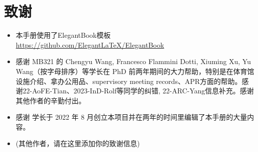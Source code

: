 \chapter{致谢}
\begin{itemize}
    \item 本手册使用了ElegantBook模板 \url{https://github.com/ElegantLaTeX/ElegantBook}
    \item \Wu \space 感谢 MB321 的 Chengyu Wang, Francesco Flammini Dotti, Xiuming Xu, Yu Wang（按字母排序）等学长在 PhD 前两年期间的大力帮助，特别是在体育馆设施介绍、拿办公用品、supervisory meeting records、APR方面的帮助。感谢22-AoFE-Tian、2023-InD-Rolf等同学的纠错, 22-ARC-Yang信息补充。感谢其他作者的辛勤付出。
    \item \Shiyao \space 感谢 \Wu \space 学长于 2022 年 8 月创立本项目并在两年的时间里编辑了本手册的大量内容。
    \item (其他作者，请在这里添加你的致谢信息)
\end{itemize}


